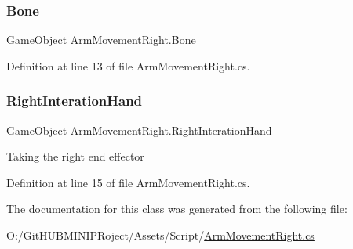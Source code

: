 \subsubsection{\texorpdfstring{Bone}{Bone}}
{\footnotesize\ttfamily Game\+Object Arm\+Movement\+Right.\+Bone}



Definition at line 13 of file Arm\+Movement\+Right.\+cs.

\mbox{\label{class_arm_movement_right_a2e301e71f3e754ca1806fbf6a7e62545}} 
\subsubsection{\texorpdfstring{RightInterationHand}{RightInterationHand}}
{\footnotesize\ttfamily Game\+Object Arm\+Movement\+Right.\+Right\+Interation\+Hand}

Taking the right end effector 

Definition at line 15 of file Arm\+Movement\+Right.\+cs.



The documentation for this class was generated from the following file\+:\begin{DoxyCompactItemize}
\item 
O\+:/\+Git\+H\+U\+B\+M\+I\+N\+I\+P\+Roject/\+Assets/\+Script/\mbox{\hyperlink{_arm_movement_right_8cs}{Arm\+Movement\+Right.\+cs}}\end{DoxyCompactItemize}
